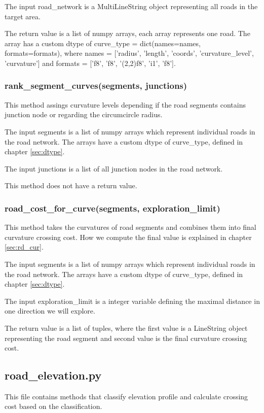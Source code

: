 \documentclass[oneside]{article}
\begin{document}
            The input road\_network is a MultiLineString object representing all roads in the target area.

            The return value is a list of numpy arrays, each array represents one road. The array has a custom dtype of curve\_type = dict(names=names, formats=formats), where names = ['radius', 'length', 'coords', 'curvature\_level', 'curvature'] and formats = ['f8', 'f8', '(2,2)f8', 'i1', 'f8'].

            \subsubsection{rank\_segment\_curves(segments, junctions)}
            This method assings curvature levels depending if the road segments contains junction node or regarding the circumcircle radius.

            The input segments is a list of numpy arrays which represent individual roads in the road network. The arrays have a custom dtype of curve\_type, defined in chapter \ref{sec:dtype}.

            The input junctions is a list of all junction nodes in the road network.

            This method does not have a return value.

            \subsubsection{road\_cost\_for\_curve(segments, exploration\_limit)}
            This method takes the curvatures of road segments and combines them into final curvature crossing cost. How we compute the final value is explained in chapter \ref{sec:rd_cur}.

            The input segments is a list of numpy arrays which represent individual roads in the road network. The arrays have a custom dtype of curve\_type, defined in chapter \ref{sec:dtype}.

            The input exploration\_limit is a integer variable defining the maximal distance in one direction we will explore.

            The return value is a list of tuples, where the first value is a LineString object representing the road segment and second value is the final curvature crossing cost.

        \subsection{road\_elevation.py}
        This file contains methods that classify elevation profile and calculate crossing cost based on the classification.
\end{document}
